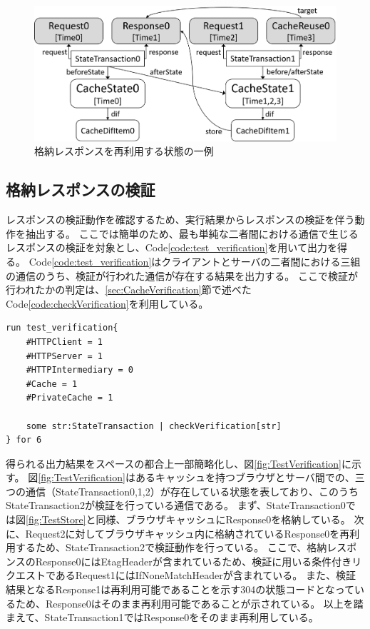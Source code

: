 \documentclass[12pt,a4paper]{jbook}
\begin{document}
\begin{figure}[htb]
\centering
\includegraphics[width=450pt]{./fig/TestReuse.eps}
\caption{格納レスポンスを再利用する状態の一例}
\label{fig:TestReuse}
\end{figure}

\subsection{格納レスポンスの検証}
レスポンスの検証動作を確認するため、実行結果からレスポンスの検証を伴う動作を抽出する。
ここでは簡単のため、最も単純な二者間における通信で生じるレスポンスの検証を対象とし、Code\ref{code:test_verification}を用いて出力を得る。
Code\ref{code:test_verification}はクライアントとサーバの二者間における三組の通信のうち、検証が行われた通信が存在する結果を出力する。
ここで検証が行われたかの判定は、\ref{sec:CacheVerification}節で述べたCode\ref{code:checkVerification}を利用している。

\begin{lstlisting}[caption=格納レスポンスの検証, label=code:test_verification]
run test_verification{
	#HTTPClient = 1
	#HTTPServer = 1
	#HTTPIntermediary = 0
	#Cache = 1
	#PrivateCache = 1

	some str:StateTransaction | checkVerification[str]
} for 6
\end{lstlisting}

得られる出力結果をスペースの都合上一部簡略化し、図\ref{fig:TestVerification}に示す。
図\ref{fig:TestVerification}はあるキャッシュを持つブラウザとサーバ間での、三つの通信（StateTransaction0,1,2）が存在している状態を表しており、このうちStateTransaction2が検証を行っている通信である。
まず、StateTransaction0では図\ref{fig:TestStore}と同様、ブラウザキャッシュにResponse0を格納している。
次に、Request2に対してブラウザキャッシュ内に格納されているResponse0を再利用するため、StateTransaction2で検証動作を行っている。
ここで、格納レスポンスのResponse0にはEtagHeaderが含まれているため、検証に用いる条件付きリクエストであるRequest1にはIfNoneMatchHeaderが含まれている。
また、検証結果となるResponse1は再利用可能であることを示す304の状態コードとなっているため、Response0はそのまま再利用可能であることが示されている。
以上を踏まえて、StateTransaction1ではResponse0をそのまま再利用している。
\end{document}
